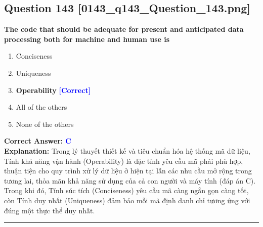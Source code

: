 \documentclass[11pt,a4paper]{article}
\begin{document}
\begin{minipage}{\textwidth}
\subsection*{Question 143 \quad \footnotesize{[0143\_q143\_Question\_143.png]}}
\noindent \textbf{The code that should be adequate for present and anticipated data processing both for machine and human use is}

\begin{enumerate}[label=\Alph*.]
    \item Conciseness
    \item Uniqueness
    \item \textbf{Operability} \hfill \textcolor{blue}{\textbf{[Correct]}}
    \item All of the others
    \item None of the others
\end{enumerate}

\noindent \textbf{Correct Answer:} \textcolor{blue}{\textbf{C}} \\[2pt]
\noindent \textbf{Explanation:} Trong lý thuyết thiết kế và tiêu chuẩn hóa hệ thống mã dữ liệu, Tính khả năng vận hành (Operability) là đặc tính yêu cầu mã phải phù hợp, thuận tiện cho quy trình xử lý dữ liệu ở hiện tại lẫn các nhu cầu mở rộng trong tương lai, thỏa mãn khả năng sử dụng của cả con người và máy tính (đáp án C). Trong khi đó, Tính súc tích (Conciseness) yêu cầu mã càng ngắn gọn càng tốt, còn Tính duy nhất (Uniqueness) đảm bảo mỗi mã định danh chỉ tương ứng với đúng một thực thể duy nhất.

\par\vspace{0.3cm}
\hrule
\vspace{0.3cm}
\end{minipage}
\end{document}
